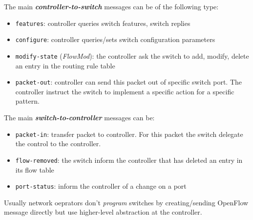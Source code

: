 \documentclass[10pt,a4paper]{report}
\theoremstyle{definition}
\begin{document}
The main \textit{\textbf{controller-to-switch}} messages can be of the following type:
\begin{itemize}
	\item 
	\texttt{features}: controller queries switch features, switch replies
	\item 
	\texttt{configure}: controller queries/sets switch configuration parameters
	\item 
	\texttt{modify-state} (\textit{FlowMod}): the controller ask the switch to add, modify, delete an entry in the routing rule table
	\item 
	\texttt{packet-out}: controller can send this packet out of specific switch port. The controller instruct the switch to implement a specific action for a specific pattern.
\end{itemize}

The main \textit{\textbf{switch-to-controller}} messages can be:
\begin{itemize}
	\item 
	\texttt{packet-in}: transfer packet to controller. For this packet the switch delegate the control to the controller.
	\item 
	\texttt{flow-removed}: the switch inform the controller that has deleted an entry in its flow table
	\item 
	\texttt{port-status}:  inform the controller of a change on a port
\end{itemize}

Usually network oeprators don't \textit{program} switches by creating/sending OpenFlow message directly but use higher-level abstraction at the controller.
\end{document}
